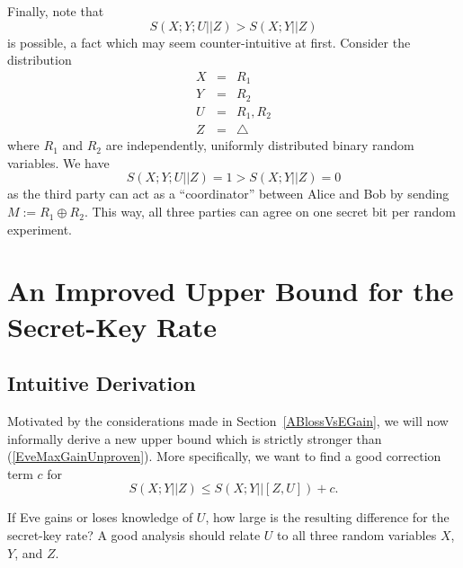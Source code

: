 \documentclass[a4paper, twoside, openany]{report}
\newcommand{\srate}{S(X;Y||Z)}
\newcommand{\blank}{\triangle}
\theoremstyle{plain}
\theoremstyle{definition}
\begin{document}
\noindent
Finally, note that
\[S(X;Y;U||Z) > S(X;Y||Z)\]
is possible, a fact which may seem counter-intuitive at first. Consider the distribution
\begin{eqnarray*}
X & = & R_1 \\
Y & = & R_2 \\
U & = & R_1, R_2 \\
Z & = & \blank
\end{eqnarray*}
where $R_1$ and $R_2$ are independently, uniformly distributed binary random variables. We have
\[S(X;Y;U||Z) = 1 > S(X;Y||Z) = 0\]
as the third party can act as a ``coordinator'' between Alice and Bob by sending $M := R_1 \oplus R_2$. This way, all three parties can agree on one secret bit per random experiment.



\section{An Improved Upper Bound for the Secret-Key Rate} \label{NewUpperBound}


\subsection{Intuitive Derivation}

Motivated by the considerations made in Section~\ref{ABlossVsEGain}, we will now informally derive a new upper bound which is strictly stronger than (\ref{EveMaxGainUnproven}). More specifically, we want to find a good correction term $c$ for
\[\srate \leq S(X;Y||[Z,U]) + c.\]

If Eve gains or loses knowledge of $U$, how large is the resulting difference for the secret-key rate? A good analysis should relate $U$ to all three random variables $X$, $Y$, and $Z$.
\end{document}
